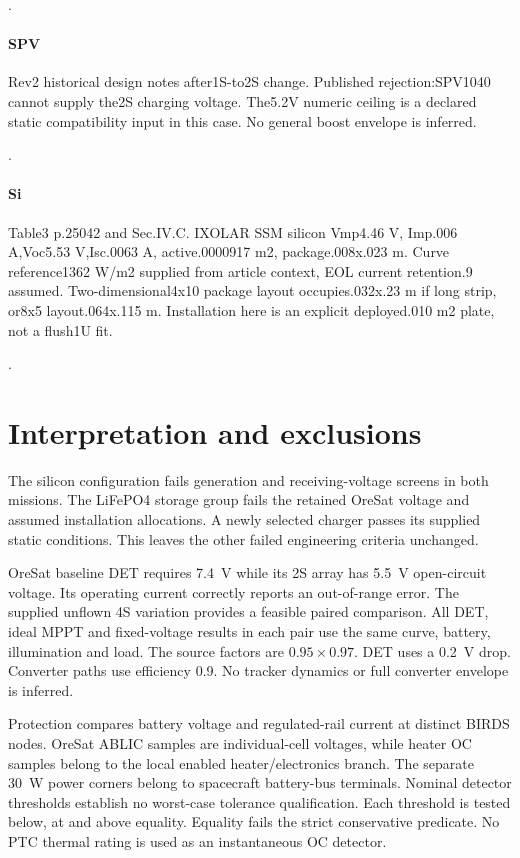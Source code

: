 \citep{oresatsolarsweep}.

\paragraph{SPV} Rev2 historical design notes after1S-to2S change. Published rejection:SPV1040 cannot supply the2S charging voltage. The5.2V numeric ceiling is a declared static compatibility input in this case. No general boost envelope is inferred.

\citep{oresatsolarhistory}.

\paragraph{Si} Table3 p.25042 and Sec.IV.C. IXOLAR SSM silicon Vmp4.46 V,\allowbreak{} Imp.006 A,\allowbreak{}Voc5.53 V,\allowbreak{}Isc.0063 A,\allowbreak{} active.0000917 m2,\allowbreak{} package.008x.023 m. Curve reference1362 W/m2 supplied from article context,\allowbreak{} EOL current retention.9 assumed. Two-dimensional4x10 package layout occupies.032x.23 m if long strip,\allowbreak{} or8x5 layout.064x.115 m. Installation here is an explicit deployed.010 m2 plate,\allowbreak{} not a flush1U fit.

\citep{shrestha2026solarreliability}.

\section{Interpretation and exclusions}
The silicon configuration fails generation and receiving-voltage screens in both
missions. The LiFePO4 storage group fails the retained OreSat voltage and assumed
installation allocations. A newly selected charger passes its supplied static
conditions. This leaves the other failed engineering criteria unchanged.

OreSat baseline DET requires 7.4~V while its 2S array has 5.5~V open-circuit voltage.
Its operating current correctly reports an out-of-range error.
The supplied unflown 4S variation provides a feasible paired comparison.
All DET, ideal MPPT and fixed-voltage results in each pair use the same curve,
battery, illumination and load. The source factors are $0.95\times0.97$.
DET uses a 0.2~V drop. Converter paths use efficiency 0.9.
No tracker dynamics or full converter envelope is inferred.

Protection compares battery voltage and regulated-rail current at distinct BIRDS
nodes. OreSat ABLIC samples are individual-cell voltages, while heater OC samples
belong to the local enabled heater/electronics branch.
The separate 30~W power corners belong to spacecraft battery-bus terminals.
Nominal detector thresholds establish no worst-case tolerance qualification.
Each threshold is tested below, at and above equality.
Equality fails the strict conservative predicate.
No PTC thermal rating is used as an instantaneous OC detector.

